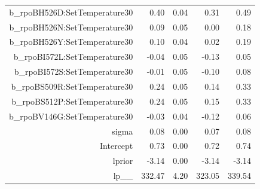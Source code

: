 \begin{table}[ht]
\begin{tabular}{rrrrr}
  b\_rpoBH526D:SetTemperature30 & 0.40 & 0.04 & 0.31 & 0.49 \\ 
  b\_rpoBH526N:SetTemperature30 & 0.09 & 0.05 & 0.00 & 0.18 \\ 
  b\_rpoBH526Y:SetTemperature30 & 0.10 & 0.04 & 0.02 & 0.19 \\ 
  b\_rpoBI572L:SetTemperature30 & -0.04 & 0.05 & -0.13 & 0.05 \\ 
  b\_rpoBI572S:SetTemperature30 & -0.01 & 0.05 & -0.10 & 0.08 \\ 
  b\_rpoBS509R:SetTemperature30 & 0.24 & 0.05 & 0.14 & 0.33 \\ 
  b\_rpoBS512P:SetTemperature30 & 0.24 & 0.05 & 0.15 & 0.33 \\ 
  b\_rpoBV146G:SetTemperature30 & -0.03 & 0.04 & -0.12 & 0.06 \\ 
  sigma & 0.08 & 0.00 & 0.07 & 0.08 \\ 
  Intercept & 0.73 & 0.00 & 0.72 & 0.74 \\ 
  lprior & -3.14 & 0.00 & -3.14 & -3.14 \\ 
  lp\_\_ & 332.47 & 4.20 & 323.05 & 339.54 \\ 
   \hline
\end{tabular}
\end{table}
